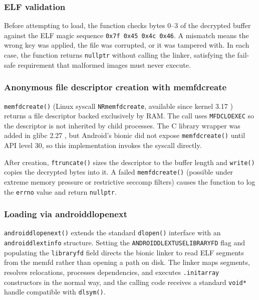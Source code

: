 \documentclass[11pt,a4paper]{report}
\renewcommand\_{{\textunderscore\allowbreak}}
\begin{document}
\subsubsection{ELF validation}

Before attempting to load, the function checks bytes 0--3 of the decrypted buffer against the ELF magic sequence \texttt{0x7f 0x45 0x4c 0x46}.  A mismatch means the wrong key was applied, the file was corrupted, or it was tampered with.  In each case, the function returns \texttt{nullptr} without calling the linker, satisfying the fail-safe requirement that malformed images must never execute.

\subsubsection{Anonymous file descriptor creation with memfd\_create}

\texttt{memfd\_create()} (Linux syscall \texttt{\_\_NR\_memfd\_create}, available since kernel 3.17 \cite{linux_memfd_create}) returns a file descriptor backed exclusively by RAM.  The call uses \texttt{MFD\_CLOEXEC} so the descriptor is not inherited by child processes.  The C library wrapper was added in glibc 2.27 \cite{linux_memfd_create}, but Android's bionic did not expose \texttt{memfd\_create()} until API level 30, so this implementation invokes the syscall directly.

After creation, \texttt{ftruncate()} sizes the descriptor to the buffer length and \texttt{write()} copies the decrypted bytes into it.  A failed \texttt{memfd\_create()} (possible under extreme memory pressure or restrictive seccomp filters) causes the function to log the \texttt{errno} value and return \texttt{nullptr}.

\subsubsection{Loading via android\_dlopen\_ext}

\texttt{android\_dlopen\_ext()} \cite{android_ndk_dlext} extends the standard \texttt{dlopen()} interface with an \texttt{android\_dlextinfo} structure.  Setting the \texttt{ANDROID\_DLEXT\_USE\_LIBRARY\_FD} flag and populating the \texttt{library\_fd} field directs the bionic linker to read ELF segments from the memfd rather than opening a path on disk.  The linker maps segments, resolves relocations, processes dependencies, and executes \texttt{.init\_array} constructors in the normal way, and the calling code receives a standard \texttt{void*} handle compatible with \texttt{dlsym()}.
\end{document}

